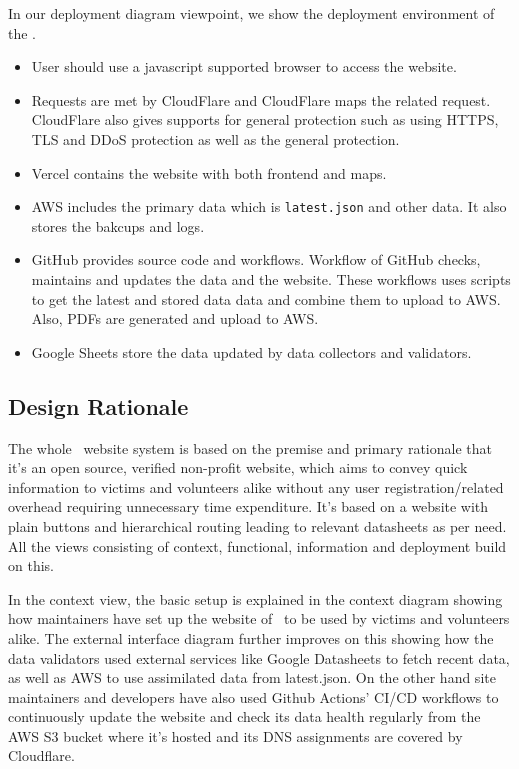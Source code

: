 In our deployment diagram viewpoint, we show the deployment environment of the \afetbilgi.
\begin{itemize}
  \item User should use a javascript supported browser to access the website.
  \item Requests are met by CloudFlare and CloudFlare maps the related request. CloudFlare also gives supports for general protection such as using HTTPS, TLS and DDoS protection as well as the general protection.
  \item Vercel contains the website with both frontend and maps.
  \item AWS includes the primary data which is \texttt{latest.json} and other data. It also stores the bakcups and logs.
  \item GitHub provides source code and workflows. Workflow of GitHub checks, maintains and updates the data and the website. These workflows uses scripts to get the latest and stored data data and combine them to upload to AWS. Also, PDFs are generated and upload to AWS.
  \item Google Sheets store the data updated by data collectors and validators.
\end{itemize}

\subsection{Design Rationale}

The whole \afetbilgi\ website system is based on the premise and primary rationale that it's an open source, verified non-profit website, which aims to convey quick information to victims and volunteers alike without any user registration/related overhead requiring unnecessary time expenditure. It's based on a website with plain buttons and hierarchical routing leading to relevant datasheets as per need. All the views consisting of context, functional, information and deployment build on this.

In the context view, the basic setup is explained in the context diagram showing how maintainers have set up the website of \afetbilgi\ to be used by victims and volunteers alike. The external interface diagram further improves on this showing how the data validators used external services like Google Datasheets to fetch recent data, as well as AWS to use assimilated data from latest.json. On the other hand site maintainers and developers have also used Github Actions' CI/CD workflows to continuously update the website and check its data health regularly from the AWS S3 bucket where it's hosted and its DNS assignments are covered by Cloudflare. 

